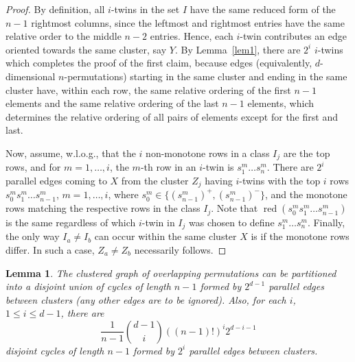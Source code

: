 \documentclass[12pt]{article}
\newtheorem{lem}[thm]{Lemma}
\DeclareMathOperator{\red}{red}
\begin{document}
\begin{proof} By definition, all $i$-twins in the set $I$ have the same reduced form of the $n-1$ rightmost columns, since the leftmost and rightmost entries have the same relative order to the middle $n-2$ entries. Hence, each $i$-twin contributes an edge oriented towards the same cluster, say $Y$. By Lemma~\ref{lem1}, there are $2^i$ $i$-twins which completes the proof of the first claim, because edges (equivalently, $d$-dimensional $n$-permutations) starting in the same cluster and ending in the same cluster have, within each row, the same relative ordering of the first $n-1$ elements and the same relative ordering of the last $n-1$ elements, which determines the relative ordering of all pairs of elements except for the first and last. 

Now, assume, w.l.o.g., that the $i$ non-monotone rows in a class $I_j$ are the top rows, and for $m=1,\ldots,i$, the $m$-th row in an $i$-twin is $s^m_1\ldots s^m_n$. There are $2^i$ parallel edges coming to $X$ from the cluster $Z_j$ having $i$-twins with the top $i$ rows $s^m_0s^m_1\ldots s^m_{n-1}$, $m=1,\ldots,i$,  where $s^m_0\in\{(s^m_{n-1})^+,(s^m_{n-1})^-\}$, and the monotone rows matching the respective rows in the class $I_j$. Note that $\red(s^m_0s^m_1\ldots s^m_{n-1})$ is the same regardless of which $i$-twin in $I_j$ was chosen to define $s^m_1\ldots s^m_n$. Finally, the only way $I_a\neq I_b$ can occur within  the same cluster $X$ is if the monotone rows differ. In such a case, $Z_a\neq Z_b$ necessarily follows. 
\end{proof}


\begin{lem}\label{lem3}  The clustered graph of overlapping permutations can be partitioned into a disjoint union of cycles of length $n-1$ formed by $2^{d-1}$ parallel edges between clusters (any other edges are to be ignored). Also, for each $i$, $1\leq i\leq d-1$, there are  
\begin{equation}\label{num-cycles}
\frac{1}{n-1}{d-1\choose i}((n-1)!)^i2^{d-i-1}
\end{equation} 
disjoint cycles of length $n-1$ formed by $2^i$ parallel edges between clusters. \end{lem}
\end{document}
